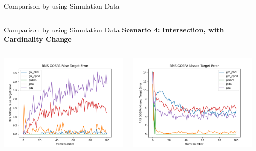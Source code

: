 \documentclass[12pt]{beamer}
\begin{document}
\begin{frame}{Comparison by using Simulation Data}
\begin{columns}[t]
\begin{column}{0.5\linewidth}
  \end{column}
\end{columns}
\end{frame}

\begin{frame}{Comparison by using Simulation Data}
\textbf{Scenario 4: Intersection, with Cardinality Change}
\begin{columns}[t]
  \begin{column}{0.5\linewidth}
      \centering
      \includegraphics[width=\linewidth,height=\textheight,keepaspectratio]{real_data/scenario5/gospa_false.png}\\
  \end{column}
    \begin{column}{0.5\linewidth}
      \centering
      \includegraphics[width=\linewidth,height=\textheight,keepaspectratio]{real_data/scenario5/missed.png}\\
  \end{column}
\end{columns}
\end{frame}
\end{document}
